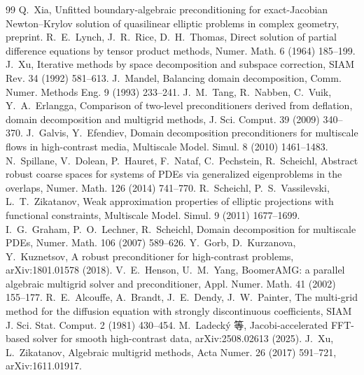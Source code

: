 \documentclass[11pt,a4paper]{ctexart}
\begin{document}
\begin{thebibliography}{99}\small
{} Q.~Xia, Unfitted boundary-algebraic preconditioning for exact-Jacobian Newton--Krylov solution of quasilinear elliptic problems in complex geometry, preprint.
 R.~E.~Lynch, J.~R.~Rice, D.~H.~Thomas, Direct solution of partial difference equations by tensor product methods, Numer. Math. 6 (1964) 185--199.
 J.~Xu, Iterative methods by space decomposition and subspace correction, SIAM Rev. 34 (1992) 581--613.
 J.~Mandel, Balancing domain decomposition, Comm. Numer. Methods Eng. 9 (1993) 233--241.
 J.~M.~Tang, R.~Nabben, C.~Vuik, Y.~A.~Erlangga, Comparison of two-level preconditioners derived from deflation, domain decomposition and multigrid methods, J. Sci. Comput. 39 (2009) 340--370.
 J.~Galvis, Y.~Efendiev, Domain decomposition preconditioners for multiscale flows in high-contrast media, Multiscale Model. Simul. 8 (2010) 1461--1483.
 N.~Spillane, V.~Dolean, P.~Hauret, F.~Nataf, C.~Pechstein, R.~Scheichl, Abstract robust coarse spaces for systems of PDEs via generalized eigenproblems in the overlaps, Numer. Math. 126 (2014) 741--770.
 R.~Scheichl, P.~S.~Vassilevski, L.~T.~Zikatanov, Weak approximation properties of elliptic projections with functional constraints, Multiscale Model. Simul. 9 (2011) 1677--1699.
 I.~G.~Graham, P.~O.~Lechner, R.~Scheichl, Domain decomposition for multiscale PDEs, Numer. Math. 106 (2007) 589--626.
 Y.~Gorb, D.~Kurzanova, Y.~Kuznetsov, A robust preconditioner for high-contrast problems, arXiv:1801.01578 (2018).
 V.~E.~Henson, U.~M.~Yang, BoomerAMG: a parallel algebraic multigrid solver and preconditioner, Appl. Numer. Math. 41 (2002) 155--177.
 R.~E.~Alcouffe, A.~Brandt, J.~E.~Dendy, J.~W.~Painter, The multi-grid method for the diffusion equation with strongly discontinuous coefficients, SIAM J. Sci. Stat. Comput. 2 (1981) 430--454.
 M.~Ladeck\'y 等, Jacobi-accelerated FFT-based solver for smooth high-contrast data, arXiv:2508.02613 (2025).
 J.~Xu, L.~Zikatanov, Algebraic multigrid methods, Acta Numer. 26 (2017) 591--721, arXiv:1611.01917.
\end{thebibliography}
\end{document}
